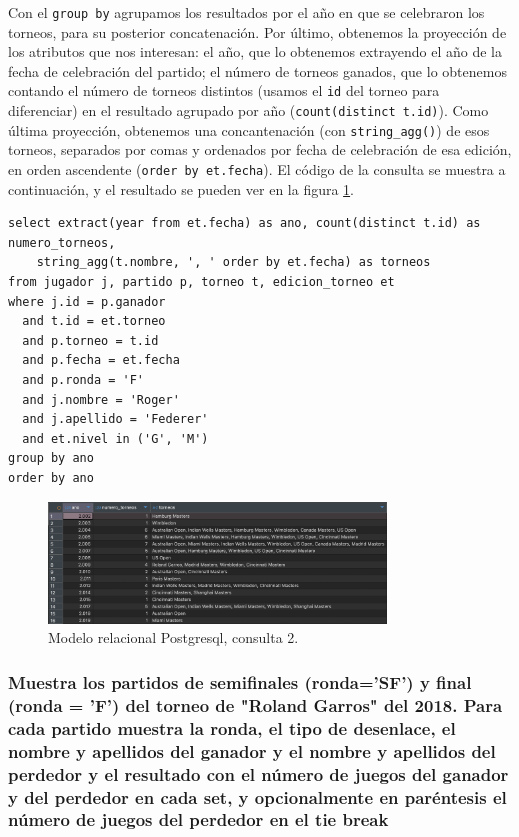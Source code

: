 \documentclass[11pt]{opticajnl}
\begin{document}
Con el \texttt{group by} agrupamos los resultados por el año en que se celebraron los torneos, para su posterior concatenación. Por último, obtenemos la proyección de los atributos que nos interesan: el año, que lo obtenemos extrayendo el año de la fecha de celebración del partido; el número de torneos ganados, que lo obtenemos contando el número de torneos distintos (usamos el \texttt{id} del torneo para diferenciar) en el resultado agrupado por año (\texttt{count(distinct t.id)}). Como última proyección, obtenemos una concantenación (con \texttt{string\_agg()}) de esos torneos, separados por comas y ordenados por fecha de celebración de esa edición, en orden ascendente (\texttt{order by et.fecha}). El código de la consulta se muestra a continuación, y el resultado se pueden ver en la figura \ref{fig:q2_rel}.

\begin{verbatim}
select extract(year from et.fecha) as ano, count(distinct t.id) as numero_torneos, 
	string_agg(t.nombre, ', ' order by et.fecha) as torneos
from jugador j, partido p, torneo t, edicion_torneo et
where j.id = p.ganador
  and t.id = et.torneo
  and p.torneo = t.id
  and p.fecha = et.fecha
  and p.ronda = 'F'
  and j.nombre = 'Roger'
  and j.apellido = 'Federer'
  and et.nivel in ('G', 'M')
group by ano
order by ano
\end{verbatim}

\begin{figure}[H]
\centering
\includegraphics[width=0.8\textwidth]{fotos/q2_rel.png}
\caption{Modelo relacional Postgresql, consulta 2.}
\label{fig:q2_rel}
\end{figure}


\subsubsection{Muestra los partidos de semiﬁnales (ronda='SF') y ﬁnal (ronda = 'F') del torneo de "Roland Garros" del 2018. Para cada partido muestra la ronda, el tipo de desenlace, el nombre y apellidos del ganador y el nombre y apellidos del perdedor y el resultado con el número de juegos del ganador y del perdedor en cada set, y opcionalmente en paréntesis el número de juegos del perdedor en el tie break}
\end{document}
